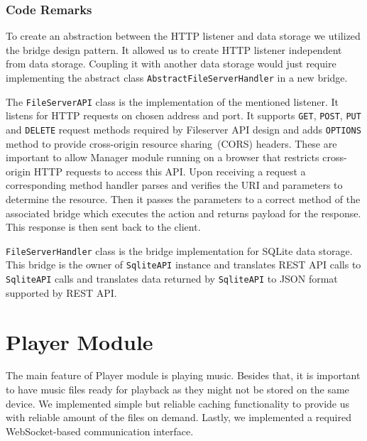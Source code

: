 \subsubsection{Code Remarks}
To create an abstraction between the HTTP listener and data storage we utilized the bridge design pattern. It allowed us to create HTTP listener independent from data storage. Coupling it with another data storage would just require implementing the abstract class \texttt{AbstractFileServerHandler} in a new bridge.
\par
The \texttt{FileServerAPI} class is the implementation of the mentioned listener. It listens for HTTP requests on chosen address and port. It supports \texttt{GET}, \texttt{POST}, \texttt{PUT} and \texttt{DELETE} request methods required by Fileserver API design and adds \texttt{OPTIONS} method to provide cross-origin resource sharing~(CORS) headers. These are important to allow Manager module running on a browser that restricts cross-origin HTTP requests to access this API. Upon receiving a request a corresponding method handler parses and verifies the URI and parameters to determine the resource. Then it passes the parameters to a correct method of the associated bridge which executes the action and returns payload for the response. This response is then sent back to the client.
\par
\texttt{FileServerHandler} class is the bridge implementation for SQLite data storage. This bridge is the owner of \texttt{SqliteAPI} instance and translates REST API calls to \texttt{SqliteAPI} calls and translates data returned by \texttt{SqliteAPI} to JSON format supported by REST API.

\section{Player Module}

The main feature of Player module is playing music. Besides that, it is important to have music files ready for playback as they might not be stored on the same device. We implemented simple but reliable caching functionality to provide us with reliable amount of the files on demand. Lastly, we implemented a required WebSocket-based communication interface.

